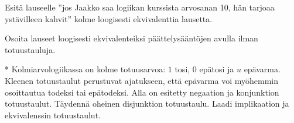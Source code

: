 \begin{tehtavasivu}
\begin{tehtava}
	Esitä lauseelle ''jos Jaakko saa logiikan kurssista
	arvosanan 10, hän tarjoaa ystävilleen kahvit'' kolme
	loogisesti ekvivalenttia lausetta.
\end{tehtava}

\begin{tehtava}
	Osoita lauseet loogisesti ekvivalenteiksi
	päättelysääntöjen avulla ilman totuustauluja.
	\begin{alakohdat}
	\end{alakohdat}
\end{tehtava}

\begin{tehtava}
	* Kolmiarvologiikassa on kolme totuusarvoa: $1$
	tosi, $0$ epätosi ja $u$ epävarma. Kleenen totuustaulut
	perustuvat ajatukseen, että epävarma voi myöhemmin
	osoittautua todeksi tai epätodeksi. Alla on esitetty
	negaation ja konjunktion totuustaulut. Täydennä
	oheinen disjunktion totuustaulu. Laadi implikaation ja
	ekvivalenssin totuustaulut.


\end{tehtava}
\end{tehtavasivu}

